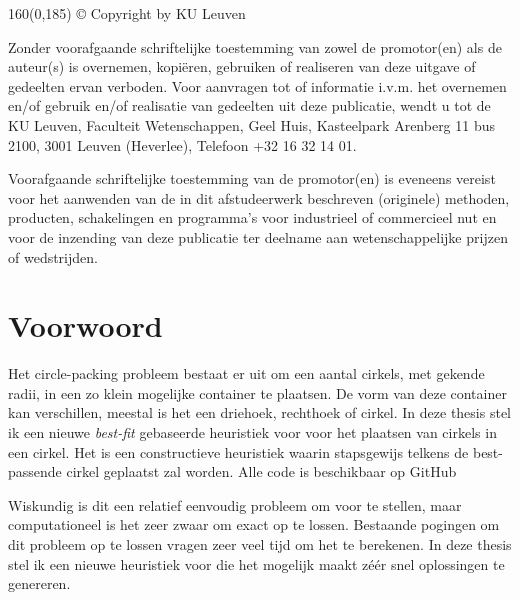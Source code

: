 \documentclass[12pt,a4paper,oneside]{book}
\begin{document}
\newpage
\thispagestyle{empty}
\begin{textblock}{160}(0,185)
© Copyright by KU Leuven

Zonder voorafgaande schriftelijke toestemming van zowel de promotor(en) als de auteur(s) is overnemen, kopiëren, gebruiken of realiseren van deze uitgave of gedeelten ervan verboden. Voor aanvragen tot of informatie i.v.m. het overnemen en/of gebruik en/of realisatie van gedeelten uit deze publicatie, wendt u tot de KU Leuven, Faculteit Wetenschappen, Geel Huis, Kasteelpark Arenberg 11 bus 2100, 3001 Leuven (Heverlee), Telefoon +32 16 32 14 01.

Voorafgaande schriftelijke toestemming van de promotor(en) is eveneens vereist voor het aanwenden van de in dit afstudeerwerk beschreven (originele) methoden, producten, schakelingen en programma’s voor industrieel of commercieel nut en voor de inzending van deze publicatie ter deelname aan wetenschappelijke prijzen of wedstrijden.
\end{textblock}

\newpage

\rmfamily
\setcounter{page}{0}

\newpage

\chapter*{Voorwoord}

Het circle-packing probleem bestaat er uit om een aantal cirkels, met gekende radii, in een zo klein mogelijke container te plaatsen.
De vorm van deze container kan verschillen, meestal is het een driehoek, rechthoek of cirkel.
In deze thesis stel ik een nieuwe \textit{best-fit} gebaseerde heuristiek voor voor het plaatsen van cirkels in een cirkel.
Het is een constructieve heuristiek waarin stapsgewijs telkens de best-passende cirkel geplaatst zal worden.
Alle code is beschikbaar op GitHub \cite{circle-packing-github}

Wiskundig is dit een relatief eenvoudig probleem om voor te stellen, maar computationeel is het zeer zwaar om exact op te lossen.
Bestaande pogingen om dit probleem op te lossen vragen zeer veel tijd om het te berekenen.
In deze thesis stel ik een nieuwe heuristiek voor die het mogelijk maakt zéér snel oplossingen te genereren.
\end{document}
